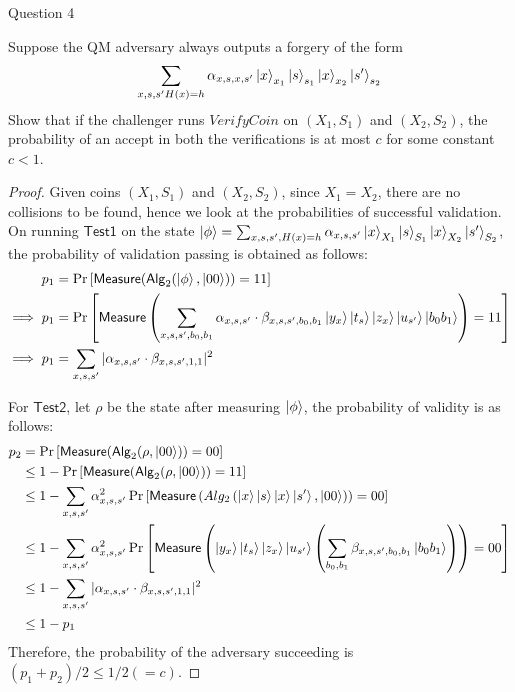 \begin{solution}{Question 4}\label{ques:4}
    \begin{question}
    Suppose the QM adversary always outputs a forgery of the form
    \[\sum_{x,s,s'\\H(x) = h} \alpha_{x,s,x,s'}\ket{x}_{x_1}\ket{s}_{s_1}\ket{x}_{x_2}\ket{s'}_{s_2} \]
    Show that if the challenger runs $VerifyCoin$ on $ (X_1, S_1) $ and $(X_2, S_2)$, the probability of an accept in both the verifications is at most $c$ for some constant $c < 1$.
    \end{question}
    \tcblower{}
    \begin{proof}
    Given coins $(X_1, S_1)$ and $(X_2, S_2)$, since $X_1 = X_2$, there are no collisions to be found, hence we look at the probabilities of successful validation. On running $\mathsf{Test1}$ on the state $\ket{\phi} = \sum_{x,s,s' , H(x) = h} \alpha_{x,s,s'}\ket{x}_{X_1}\ket{s}_{S_1}\ket{x}_{X_2}\ket{s'}_{S_2}$, the probability of validation passing is obtained as follows:
    \begin{equation}
        \begin{split}
            p_1 &= \Pr\left[ \mathsf{Measure}(\mathsf{Alg}_2(\ket{\phi}, \ket{00})) = 11 \right]\\
            \implies p_1 &= \Pr\left[ \mathsf{Measure}\left(\sum_{x,s,s',b_0,b_1}\alpha_{x,s,s'}\cdot\beta_{x,s,s',b_0,b_1}\ket{y_x}\ket{t_s}\ket{z_x}\ket{u_{s'}}\ket{b_0b_1}\right) = 11 \right]\\
            \implies p_1 &= \sum_{x,s,s'}|\alpha_{x,s,s'}\cdot\beta_{x,s,s',1,1}|^2
        \end{split}
    \end{equation}

    For $\mathsf{Test2}$, let $\rho$ be the state after measuring $\ket{\phi}$, the probability of validity is as follows:
    \begin{equation}
        \begin{split}
            p_2 &= \Pr\left[ \mathsf{Measure}(\mathsf{Alg}_2(\rho, \ket{00})) = 00 \right]\\
                &\leq 1 - \Pr\left[ \mathsf{Measure}(\mathsf{Alg}_2(\rho, \ket{00})) = 11 \right]\\
                &\leq 1 - \sum_{x,s,s'} \alpha_{x,s,s'}^2 \Pr\left[ \mathsf{Measure}\left(Alg_2\left(\ket{x}\ket{s}\ket{x}\ket{s'}, \ket{00}\right)\right) = 00 \right]\\
                &\leq 1 - \sum_{x,s,s'} \alpha_{x,s,s'}^2 \Pr\left[ \mathsf{Measure}\left(\ket{y_x}\ket{t_s}\ket{z_x}\ket{u_{s'}}\left(\sum_{b_0,b_1}\beta_{x,s,s',b_0,b_1}\ket{b_0b_1}\right)\right) = 00 \right]\\
                &\leq 1 - \sum_{x,s,s'}|\alpha_{x,s,s'}\cdot\beta_{x,s,s',1,1}|^2\\
                &\leq 1 - p_1
        \end{split}
    \end{equation}
    Therefore, the probability of the adversary succeeding is $(p_1 + p_2)/2\leq 1/2 (= c)$.
    \end{proof}
\end{solution}
 